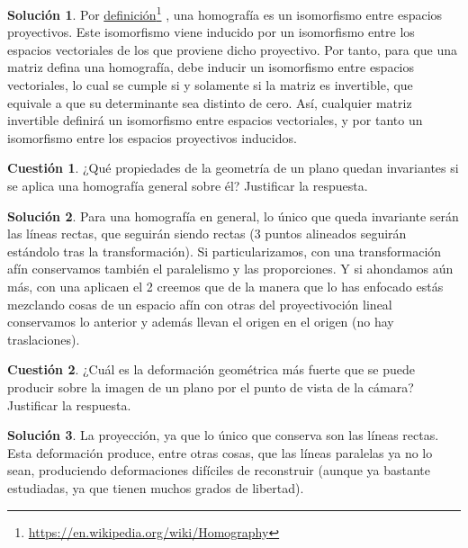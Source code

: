 \documentclass[a4paper, 11pt]{article}
\newcommand\fnurl[2]{%
  \href{#2}{#1}\footnote{\url{#2}}%
}
\theoremstyle{definition}
\newtheorem{cuestion}{Cuestión}
\newtheorem*{solucion}{Solución}
\begin{document}
  \begin{solucion}
      Por \fnurl{definición}{https://en.wikipedia.org/wiki/Homography}, una homografía
      es un isomorfismo entre espacios proyectivos. Este isomorfismo viene inducido
      por un isomorfismo entre los espacios vectoriales de los que proviene dicho proyectivo.
      Por tanto, para que una matriz defina una homografía, debe inducir un isomorfismo
      entre espacios vectoriales, lo cual se cumple si y solamente si la matriz es invertible,
      que equivale a que su determinante sea distinto de cero. Así, cualquier matriz invertible
      definirá un isomorfismo entre espacios vectoriales, y por tanto un isomorfismo entre
      los espacios proyectivos inducidos.
  \end{solucion}

  \begin{cuestion}
    ¿Qué propiedades de la geometría de un plano quedan invariantes si se aplica
    una homografía general sobre él? Justificar la respuesta.
  \end{cuestion}

  \begin{solucion}
    Para una homografía en general, lo único que queda invariante serán las líneas
    rectas, que seguirán siendo rectas (3 puntos alineados seguirán estándolo tras la transformación).
    Si particularizamos, con una transformación afín conservamos también el paralelismo y las proporciones. Y si ahondamos aún más, con
    una aplicaen el 2 creemos que de la manera que lo has enfocado estás mezclando cosas de un espacio afín con otras del proyectivoción lineal conservamos lo anterior y además llevan el origen en el origen
    (no hay traslaciones).
  \end{solucion}

  \begin{cuestion}
    ¿Cuál es la deformación geométrica más fuerte que se puede producir sobre
    la imagen de un plano por el punto de vista de la cámara? Justificar la respuesta.
  \end{cuestion}

  \begin{solucion}
    La proyección, ya que lo único que conserva son las líneas rectas. Esta deformación
    produce, entre otras cosas, que las líneas paralelas ya no lo sean, produciendo
    deformaciones difíciles de reconstruir (aunque ya bastante estudiadas, ya que tienen muchos
    grados de libertad).
  \end{solucion}
\end{document}
